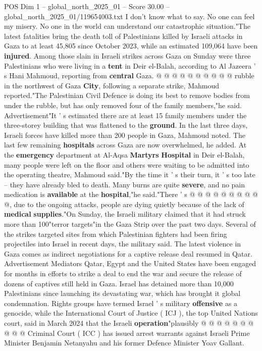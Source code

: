 \begin{textsample}{POS Dim 1 – global\_north\_2025\_01 – Score 30.00 – global\_north\_2025\_01/119654003.txt}
I don't know what to say.
No one can feel my misery.
No one in the world can understand our catastrophic situation."The latest fatalities bring the death toll of Palestinians killed by Israeli attacks in Gaza to at least 45,805 since October 2023, while an estimated 109,064 have been \textbf{injured}.
Among those slain in Israeli strikes across Gaza on Sunday were three Palestinians who were living in a \textbf{tent} in Deir el-Balah, according to Al Jazeera ' s Hani Mahmoud, reporting from \textbf{central} Gaza. @ @ @ @ @ @ @ @ @ @ rubble in the northwest of Gaza \textbf{City}, following a separate strike, Mahmoud reported."The Palestinian Civil Defence is doing its best to remove bodies from under the rubble, but has only removed four of the family members,"he said.
Advertisement"It ' s estimated there are at least 15 family members under the three-storey building that was flattened to the \textbf{ground}.
In the last three days, Israeli forces have killed more than 200 people in Gaza, Mahmoud noted.
The last few remaining \textbf{hospitals} across Gaza are now overwhelmed, he added.
At the \textbf{emergency} department at Al-Aqsa \textbf{Martyrs} \textbf{Hospital} in Deir el-Balah, many people were left on the floor and others were waiting to be admitted into the operating theatre, Mahmoud said."By the time it ' s their turn, it ' s too late -- they have already bled to death.
Many burns are quite \textbf{severe}, and no pain medication is \textbf{available} at the \textbf{hospital},"he said."There ' s @ @ @ @ @ @ @ @ @ @, due to the ongoing attacks, people are dying quietly because of the lack of \textbf{medical} \textbf{supplies}."On Sunday, the Israeli military claimed that it had struck more than 100"terror targets"in the Gaza Strip over the past two days.
Several of the strikes targeted sites from which Palestinian fighters had been firing projectiles into Israel in recent days, the military said.
The latest violence in Gaza comes as indirect negotiations for a captive release deal resumed in Qatar.
Advertisement Mediators Qatar, Egypt and the United States have been engaged for months in efforts to strike a deal to end the war and secure the release of dozens of captives still held in Gaza.
Israel has detained more than 10,000 Palestinians since launching its devastating war, which has brought it global condemnation.
Rights groups have termed Israel ' s military \textbf{offensive} as a genocide, while the International Court of Justice ( ICJ ), the top United Nations court, said in March 2024 that the Israeli \textbf{operation}"plausibly @ @ @ @ @ @ @ @ @ @ Criminal Court ( ICC ) has issued arrest warrants against Israeli Prime Minister Benjamin Netanyahu and his former Defence Minister Yoav Gallant.

\end{textsample}
